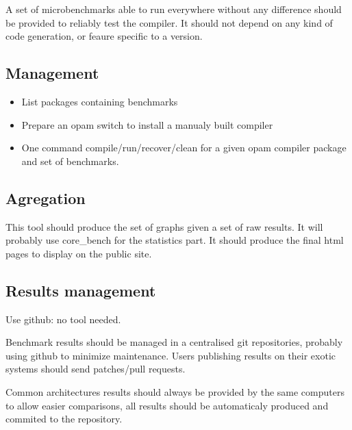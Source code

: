 \documentclass[11pt,a4paper]{article}
\begin{document}
A set of microbenchmarks able to run everywhere without any difference
should be provided to reliably test the compiler. It should not depend
on any kind of code generation, or feaure specific to a version.

\subsection{Management}

\begin{itemize}
\item List packages containing benchmarks
\item Prepare an opam switch to install a manualy built compiler
\item One command compile/run/recover/clean for a given opam compiler
  package and set of benchmarks.
\end{itemize}

\subsection{Agregation}

This tool should produce the set of graphs given a set of raw
results. It will probably use core\_bench for the statistics part. It
should produce the final html pages to display on the public site.

\subsection{Results management}

Use github: no tool needed.

Benchmark results should be managed in a centralised git repositories,
probably using github to minimize maintenance. Users publishing
results on their exotic systems should send patches/pull requests.

Common architectures results should always be provided by the same
computers to allow easier comparisons, all results should be
automaticaly produced and commited to the repository.
\end{document}
